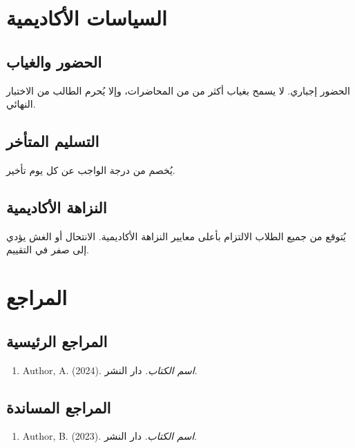 \documentclass[11pt,a4paper]{article}
\begin{document}
\section{السياسات الأكاديمية}
\label{sec:policies}

\subsection{الحضور والغياب}
الحضور إجباري. لا يسمح بغياب أكثر من  من المحاضرات، وإلا يُحرم الطالب من الاختبار النهائي.

\subsection{التسليم المتأخر}
يُخصم  من درجة الواجب عن كل يوم تأخير.

\subsection{النزاهة الأكاديمية}
يُتوقع من جميع الطلاب الالتزام بأعلى معايير النزاهة الأكاديمية. الانتحال أو الغش يؤدي إلى صفر في التقييم.

\section{المراجع}
\label{sec:references}

\subsection{المراجع الرئيسية}
\begin{enumerate}
    \item Author, A. (2024). \emph{اسم الكتاب}. دار النشر.
\end{enumerate}

\subsection{المراجع المساندة}
\begin{enumerate}
    \item Author, B. (2023). \emph{اسم الكتاب}. دار النشر.
\end{enumerate}
\end{document}
